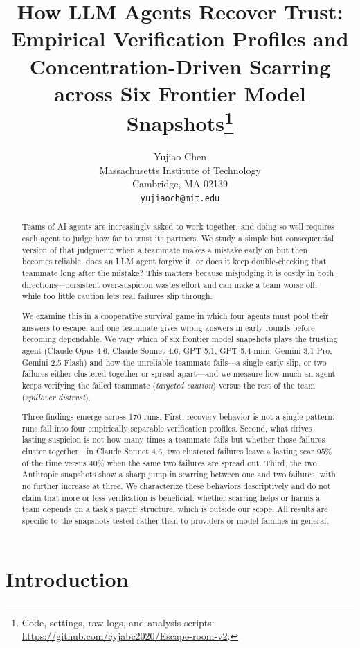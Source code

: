\documentclass{article}
\title{How LLM Agents Recover Trust:\\Empirical Verification Profiles and Concentration-Driven Scarring across Six Frontier Model Snapshots\thanks{Code, settings, raw logs, and analysis scripts: \url{https://github.com/cyjabc2020/Escape-room-v2}.}}
\author{
  Yujiao Chen \\
  Massachusetts Institute of Technology \\
  Cambridge, MA 02139 \\
  \texttt{yujiaoch@mit.edu}
}
\begin{document}
\maketitle

\begin{abstract}
Teams of AI agents are increasingly asked to work together, and doing so well requires each agent to judge how far to trust its partners. We study a simple but consequential version of that judgment: when a teammate makes a mistake early on but then becomes reliable, does an LLM agent forgive it, or does it keep double-checking that teammate long after the mistake? This matters because misjudging it is costly in both directions---persistent over-suspicion wastes effort and can make a team worse off, while too little caution lets real failures slip through.

We examine this in a cooperative survival game in which four agents must pool their answers to escape, and one teammate gives wrong answers in early rounds before becoming dependable. We vary which of six frontier model snapshots plays the trusting agent (Claude Opus 4.6, Claude Sonnet 4.6, GPT-5.1, GPT-5.4-mini, Gemini 3.1 Pro, Gemini 2.5 Flash) and how the unreliable teammate fails---a single early slip, or two failures either clustered together or spread apart---and we measure how much an agent keeps verifying the failed teammate (\emph{targeted caution}) versus the rest of the team (\emph{spillover distrust}).

Three findings emerge across 170 runs. First, recovery behavior is not a single pattern: runs fall into four empirically separable verification profiles. Second, what drives lasting suspicion is not how many times a teammate fails but whether those failures cluster together---in Claude Sonnet 4.6, two clustered failures leave a lasting scar $95\%$ of the time versus $40\%$ when the same two failures are spread out. Third, the two Anthropic snapshots show a sharp jump in scarring between one and two failures, with no further increase at three. We characterize these behaviors descriptively and do not claim that more or less verification is beneficial: whether scarring helps or harms a team depends on a task's payoff structure, which is outside our scope. All results are specific to the snapshots tested rather than to providers or model families in general.
\end{abstract}

\section{Introduction}
\label{sec:intro}
\end{document}
